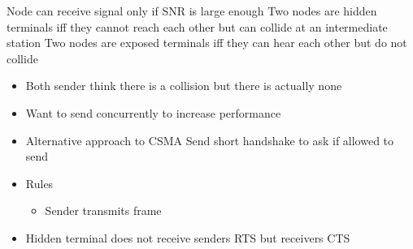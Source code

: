 \begin{itemize}
\begin{itemize}
\begin{itemize}
                        \begin{itemize}
                             Node can receive signal only if SNR is large enough
                             Two nodes are hidden terminals iff they cannot reach each other but can collide at an intermediate station
                             Two nodes are exposed terminals iff they can hear each other but do not collide
                                \begin{itemize}
                                    \item Both sender think there is a collision but there is actually none
                                    \item Want to send concurrently to increase performance
                                \end{itemize}
                        \end{itemize}
                \end{itemize}
                \begin{itemize}
                    \item Alternative approach to CSMA
                     Send short handshake to ask if allowed to send
                    \item Rules
                        \begin{itemize}
                             Send by sender node to ask for allowance
                                \begin{itemize}
                                    \item Contains the frame length the sender wants to send
                                \end{itemize}
                             Send by receiver if sender is allowed to send frame
                                \begin{itemize}
                                    \item Contains the frame length the sender wants to send
                                \end{itemize}
                            \item Sender transmits frame
                        \end{itemize}
                    \item Hidden terminal does not receive senders RTS but receivers CTS

\end{itemize}
\end{itemize}
\end{itemize}
